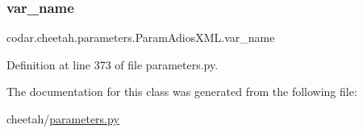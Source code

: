 \subsubsection{\texorpdfstring{var\+\_\+name}{var\_name}}
{\footnotesize\ttfamily codar.\+cheetah.\+parameters.\+Param\+Adios\+X\+M\+L.\+var\+\_\+name}



Definition at line 373 of file parameters.\+py.



The documentation for this class was generated from the following file\+:\begin{DoxyCompactItemize}
\item 
cheetah/\hyperlink{parameters_8py}{parameters.\+py}\end{DoxyCompactItemize}
